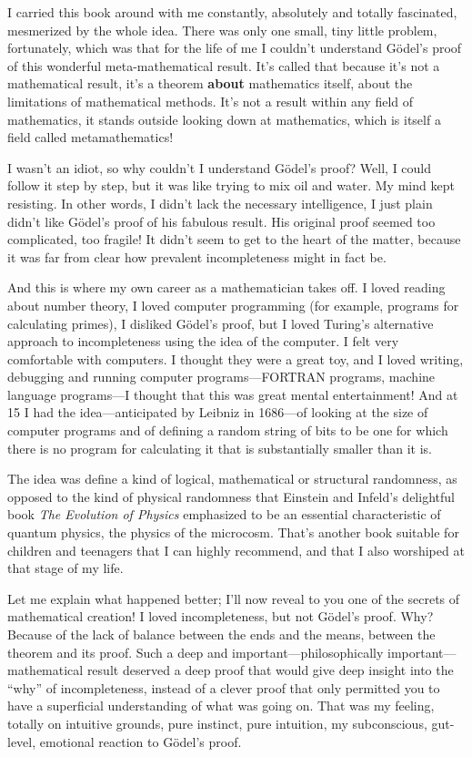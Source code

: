 \documentclass[12pt]{book}
\begin{document}
I carried this book around with me constantly, absolutely and totally fascinated, mesmerized
by the whole idea.  There was only one small, tiny little problem, fortunately, which was
that for the life of me I couldn't understand G\"odel's proof of this wonderful
meta-mathematical result. It's called that because it's not a mathematical result, it's
a theorem \textbf{about} mathematics itself, about the limitations of mathematical methods.
It's not a result within any field of mathematics, it stands outside looking down at mathematics,
which is itself a field called metamathematics!

I wasn't an idiot, so why couldn't I understand G\"odel's proof?  Well, I could follow
it step by step, but it was like trying to mix oil and water. My mind kept resisting.
In other words, I didn't lack the necessary intelligence, I just plain didn't like G\"odel's proof
of his fabulous result.  
His original proof seemed too complicated, too fragile!  It didn't seem to get to the heart
of the matter, because it was far from clear how prevalent incompleteness might in fact be.

And this is where my own career as a mathematician takes off.
I loved reading about number theory, I loved computer programming 
(for example, programs for calculating primes), I disliked G\"odel's
proof, but I loved Turing's alternative approach to incompleteness using the idea of the computer.
I felt very comfortable with computers. I thought they were a great toy, and I loved
writing, debugging and running computer programs---FORTRAN programs, 
machine language programs---I thought that this was great mental entertainment!
And at 15 I had the idea---anticipated by Leibniz in 1686---of looking at the
size of computer programs and of defining
a random string of bits to be one for which there is no program for calculating it that
is substantially smaller than it is.

The idea was define a kind of logical, mathematical or structural randomness, as opposed to the kind
of physical randomness that
Einstein and Infeld's delightful book \emph{The Evolution of Physics} emphasized to be
an essential characteristic of quantum physics, the physics of the microcosm.
That's another book suitable for children and teenagers that I can highly recommend,
and that I also worshiped at that stage of my life.

Let me explain what happened better; 
I'll now reveal to you one of the secrets of mathematical creation!
I loved incompleteness, but not G\"odel's proof.  Why?  Because of the lack of balance
between the ends and the means, between the theorem and its proof.
Such a deep and important---philosophically important---mathematical result deserved
a deep proof that would give deep insight into the ``why'' of incompleteness, instead of a clever
proof that only permitted you to have a superficial understanding of what was going on.
That was my feeling, totally on intuitive grounds, pure instinct, pure intuition,
my subconscious, gut-level, emotional reaction to G\"odel's proof.
\end{document}
